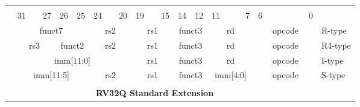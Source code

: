 \begin{table}[p]
\begin{small}
\begin{center}
    \begin{tabular} {p{0.002in}p{0.002in}p{0.002in}p{0.002in}p{0.002in}p{0.002in}p{0.002in}p{0.002in}p{0.002in}p{0.002in}p{0.002in}p{0.002in}p{0.002in}p{0.002in}p{0.002in}p{0.002in}p{0.002in}p{0.002in}p{0.002in}p{0.002in}p{0.002in}p{0.002in}p{0.002in}p{0.002in}p{0.002in}p{0.002in}p{0.002in}p{0.002in}p{0.002in}p{0.002in}p{0.002in}p{0.002in}p{0.002in}l}
    & & & & & & & & & & & & & & & & & & & & & & & & & & & & & & & & \\

            &

    \multicolumn{3}{l}{31} &
    \multicolumn{2}{r}{27} &
    \multicolumn{1}{c}{26} &
    \multicolumn{1}{r}{25} &
    \multicolumn{3}{l}{24} &
    \multicolumn{2}{r}{20} &
    \multicolumn{3}{l}{19} &
    \multicolumn{2}{r}{15} &
    \multicolumn{2}{l}{14} &
    \multicolumn{1}{r}{12} &
    \multicolumn{4}{l}{11} &
    \multicolumn{1}{r}{7} &
    \multicolumn{6}{l}{6} &
    \multicolumn{1}{r}{0} \\
    \cline{2-33}
&


\multicolumn{7}{|c|}{funct7} &
\multicolumn{5}{c|}{rs2} &
\multicolumn{5}{c|}{rs1} &
\multicolumn{3}{c|}{funct3} &
\multicolumn{5}{c|}{rd} &
\multicolumn{7}{|c|}{opcode} & R-type \\
\cline{2-33}
&

\multicolumn{5}{|c|}{rs3} &
\multicolumn{2}{c|}{funct2} &
\multicolumn{5}{c|}{rs2} &
\multicolumn{5}{c|}{rs1} &
\multicolumn{3}{c|}{funct3} &
\multicolumn{5}{c|}{rd} &
\multicolumn{7}{|c|}{opcode} & R4-type \\
\cline{2-33}
&

\multicolumn{12}{|c|}{imm[11:0]} &
\multicolumn{5}{c|}{rs1} &
\multicolumn{3}{c|}{funct3} &
\multicolumn{5}{c|}{rd} &
\multicolumn{7}{|c|}{opcode} & I-type \\
\cline{2-33}
&

\multicolumn{7}{|c|}{imm[11:5]} &
\multicolumn{5}{c|}{rs2} &
\multicolumn{5}{c|}{rs1} &
\multicolumn{3}{c|}{funct3} &
\multicolumn{5}{c|}{imm[4:0]} &
\multicolumn{7}{|c|}{opcode} & S-type \\
\cline{2-33}
&




\multicolumn{32}{c}{} & \\
\multicolumn{32}{c}{\bfseries RV32Q Standard Extension } & \\
\cline{2-33}


\end{tabular}
\end{center}
\end{small}
\end{table}
